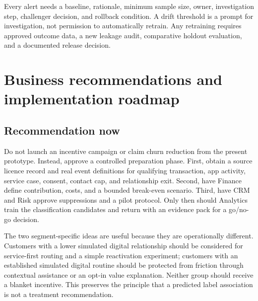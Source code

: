 \documentclass[a4paper,12pt]{article}
\begin{document}
Every alert needs a baseline, rationale, minimum sample size, owner, investigation step, challenger decision, and rollback condition. A drift threshold is a prompt for investigation, not permission to automatically retrain. Any retraining requires approved outcome data, a new leakage audit, comparative holdout evaluation, and a documented release decision.

\section{Business recommendations and implementation roadmap}

\subsection{Recommendation now}

Do not launch an incentive campaign or claim churn reduction from the present prototype. Instead, approve a controlled preparation phase. First, obtain a source licence record and real event definitions for qualifying transaction, app activity, service case, consent, contact cap, and relationship exit. Second, have Finance define contribution, costs, and a bounded break-even scenario. Third, have CRM and Risk approve suppressions and a pilot protocol. Only then should Analytics train the classification candidates and return with an evidence pack for a go/no-go decision.

The two segment-specific ideas are useful because they are operationally different. Customers with a lower simulated digital relationship should be considered for service-first routing and a simple reactivation experiment; customers with an established simulated digital routine should be protected from friction through contextual assistance or an opt-in value explanation. Neither group should receive a blanket incentive. This preserves the principle that a predicted label association is not a treatment recommendation.
\end{document}
